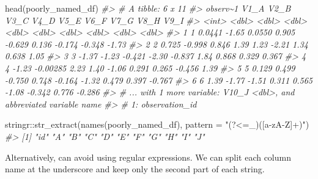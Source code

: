 \documentclass[
  12pt,
]{book}
\newenvironment{Shaded}{\begin{snugshade}}{\end{snugshade}}
\newcommand{\AttributeTok}[1]{\textcolor[rgb]{0.77,0.63,0.00}{#1}}
\newcommand{\CommentTok}[1]{\textcolor[rgb]{0.56,0.35,0.01}{\textit{#1}}}
\newcommand{\FunctionTok}[1]{\textcolor[rgb]{0.00,0.00,0.00}{#1}}
\newcommand{\NormalTok}[1]{#1}
\newcommand{\SpecialCharTok}[1]{\textcolor[rgb]{0.00,0.00,0.00}{#1}}
\newcommand{\StringTok}[1]{\textcolor[rgb]{0.31,0.60,0.02}{#1}}
\begin{document}
\begin{Shaded}
\begin{Highlighting}[]
\FunctionTok{head}\NormalTok{(poorly\_named\_df)}
\CommentTok{\#\textgreater{} \# A tibble: 6 x 11}
\CommentTok{\#\textgreater{}   observ\textasciitilde{}1    V1\_A     V2\_B    V3\_C   V4\_D   V5\_E   V6\_F   V7\_G   V8\_H   V9\_I}
\CommentTok{\#\textgreater{}      \textless{}int\textgreater{}   \textless{}dbl\textgreater{}    \textless{}dbl\textgreater{}   \textless{}dbl\textgreater{}  \textless{}dbl\textgreater{}  \textless{}dbl\textgreater{}  \textless{}dbl\textgreater{}  \textless{}dbl\textgreater{}  \textless{}dbl\textgreater{}  \textless{}dbl\textgreater{}}
\CommentTok{\#\textgreater{} 1        1  0.0441 {-}1.65     0.0550  0.905 {-}0.629  0.136 {-}0.174 {-}0.348 {-}1.73 }
\CommentTok{\#\textgreater{} 2        2  0.725  {-}0.998    0.846   1.39   1.23  {-}2.21   1.34   0.638  1.05 }
\CommentTok{\#\textgreater{} 3        3 {-}1.37   {-}1.23    {-}0.421  {-}2.30  {-}0.837  1.84   0.868  0.329  0.367}
\CommentTok{\#\textgreater{} 4        4 {-}1.23   {-}0.00285  2.23    1.40  {-}1.06   0.291  0.265 {-}0.456  1.39 }
\CommentTok{\#\textgreater{} 5        5  0.129   0.499   {-}0.750   0.748 {-}0.164 {-}1.32   0.479  0.397 {-}0.767}
\CommentTok{\#\textgreater{} 6        6  1.39   {-}1.77    {-}1.51    0.311  0.565 {-}1.08  {-}0.342  0.776 {-}0.286}
\CommentTok{\#\textgreater{} \# ... with 1 more variable: V10\_J \textless{}dbl\textgreater{}, and abbreviated variable name}
\CommentTok{\#\textgreater{} \#   1: observation\_id}
\end{Highlighting}
\end{Shaded}

\begin{Shaded}
\begin{Highlighting}[]
\NormalTok{stringr}\SpecialCharTok{::}\FunctionTok{str\_extract}\NormalTok{(}\FunctionTok{names}\NormalTok{(poorly\_named\_df), }\AttributeTok{pattern =} \StringTok{"(?\textless{}=\_)([a{-}zA{-}Z]+)"}\NormalTok{)}
\CommentTok{\#\textgreater{}  [1] "id" "A"  "B"  "C"  "D"  "E"  "F"  "G"  "H"  "I"  "J"}
\end{Highlighting}
\end{Shaded}

Alternatively, can avoid using regular expressions. We can split each column name at the underscore and keep only the second part of each string.
\end{document}
